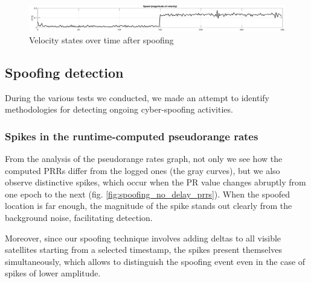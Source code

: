 \begin{figure}[H]
    \centering
    \includegraphics[width=1.00
    \linewidth]{images/spoofing_velocities_no_delay.pdf}
    \caption{Velocity states over time after spoofing}
    \label{fig:spoofing_velocities_no_delay}
\end{figure}

\subsection{Spoofing detection}
During the various tests we conducted, we made an attempt to identify methodologies for detecting ongoing cyber-spoofing activities.
\subsubsection{Spikes in the runtime-computed pseudorange rates} 
\label{sec:boh}
From the analysis of the pseudorange rates graph, not only we see how the computed PRRs differ from the logged ones (the gray curves), but we also observe distinctive spikes, which occur when the PR value changes abruptly from one epoch to the next (fig. \ref{fig:spoofing_no_delay_prrs}).
When the spoofed location is far enough, the magnitude of the spike stands out clearly from the background noise, facilitating detection. 

Moreover, since our spoofing technique involves adding deltas to all visible satellites starting from a selected timestamp, the spikes present themselves simultaneously, which allows to distinguish the spoofing event even in the case of spikes of lower amplitude. 
